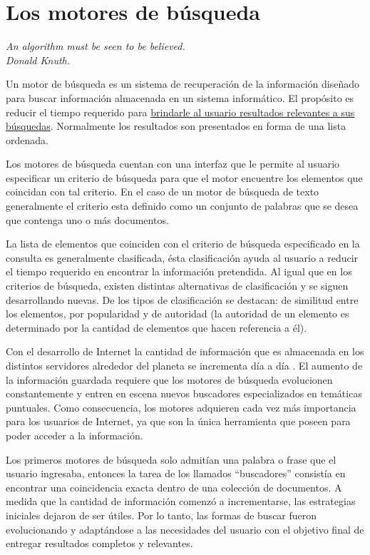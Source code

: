 \section{Los motores de búsqueda}
{\begin{small}%
\begin{flushright}%
\it An algorithm must be seen to be believed.\\Donald Knuth.
\end{flushright}%
\end{small}%
\vspace{.5cm}}

Un motor de búsqueda es un sistema de recuperación de la información diseñado para buscar información almacenada en un sistema informático. El propósito es reducir el tiempo requerido para \underline{brindarle al usuario resultados relevantes a sus búsquedas}. Normalmente los resultados son presentados en forma de una lista ordenada.

Los motores de búsqueda cuentan con una interfaz que le permite al usuario especificar un criterio de búsqueda para que el motor encuentre los elementos que coincidan con tal criterio. En el caso de un motor de búsqueda de texto generalmente el criterio esta definido como un conjunto de palabras que se desea que contenga uno o más documentos.

La lista de elementos que coinciden con el criterio de búsqueda especificado en la consulta es generalmente clasificada, ésta clasificación ayuda al usuario a reducir el tiempo requerido en encontrar la información pretendida. Al igual que en los criterios de búsqueda, existen distintas alternativas de clasificación y se siguen desarrollando nuevas. De los tipos de clasificación se destacan: de similitud entre los elementos, por popularidad y de autoridad (la autoridad de un elemento es determinado por la cantidad de elementos que hacen referencia a él).

Con el desarrollo de Internet la cantidad de información que es almacenada en los distintos servidores alrededor del planeta se incrementa día a día \cite{url:internetUsers}. El aumento de la información guardada requiere que los motores de búsqueda evolucionen constantemente y entren en escena nuevos buscadores especializados en temáticas puntuales. Como consecuencia, los motores adquieren cada vez más importancia para los usuarios de Internet, ya que son la única herramienta que poseen para poder acceder a la información.

Los primeros motores de búsqueda solo admitían una palabra o frase que el usuario ingresaba, entonces la tarea de los llamados ``buscadores'' consistía en encontrar una coincidencia exacta dentro de una colección de documentos. A medida que la cantidad de información comenzó a incrementarse, las estrategias iniciales dejaron de ser útiles. Por lo tanto, las formas de buscar fueron evolucionando y adaptándose a las necesidades del usuario con el objetivo final de entregar resultados completos y relevantes.

